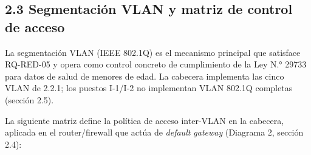 \documentclass[11pt,a4paper]{article}
\begin{document}
\subsection{2.3 Segmentación VLAN y matriz de control de acceso}\label{segmentaciuxf3n-vlan-y-matriz-de-control-de-acceso}

La segmentación VLAN (IEEE 802.1Q) es el mecanismo principal que satisface RQ-RED-05 y opera como control concreto de cumplimiento de la Ley N.° 29733 para datos de salud de menores de edad. La cabecera implementa las cinco VLAN de 2.2.1; los puestos I-1/I-2 no implementan VLAN 802.1Q completas (sección 2.5).

La siguiente matriz define la política de acceso inter-VLAN en la cabecera, aplicada en el router/firewall que actúa de \emph{default gateway} (Diagrama 2, sección 2.4):
\end{document}

